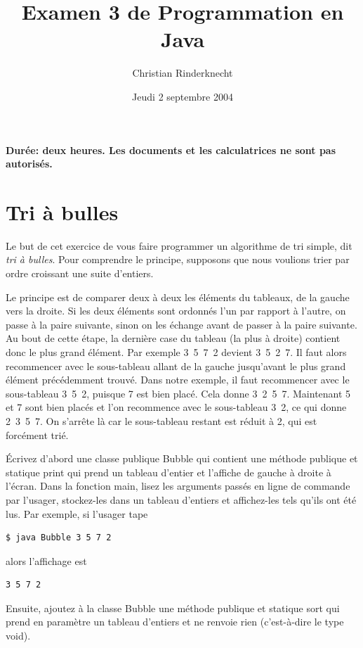 \documentclass[11pt,a4paper]{article}
\title{Examen 3 de Programmation en Java}
\author{Christian Rinderknecht}
\date{Jeudi 2 septembre 2004}
\begin{document}
\maketitle

\noindent
\textbf{Durée: deux heures. Les documents et les calculatrices ne sont
 pas autorisés.}


\section{Tri à bulles}

\noindent Le but de cet exercice de vous faire programmer un
algorithme de tri simple, dit \emph{tri à bulles}. Pour comprendre le
principe, supposons que nous voulions trier par ordre croissant une
suite d'entiers.

\medskip

Le principe est de comparer deux à deux les éléments du tableaux, de
la gauche vers la droite. Si les deux éléments sont ordonnés l'un par
rapport à l'autre, on passe à la paire suivante, sinon on les échange
avant de passer à la paire suivante. Au bout de cette étape, la
dernière case du tableau (la plus à droite) contient donc le plus
grand élément. Par exemple 3~5~7~2 devient 3~5~2~7. Il faut alors
recommencer avec le sous-tableau allant de la gauche jusqu'avant le
plus grand élément précédemment trouvé. Dans notre exemple, il faut
recommencer avec le sous-tableau 3~5~2, puisque 7 est bien placé. Cela
donne 3~2~5~7. Maintenant 5 et 7 sont bien placés et l'on recommence
avec le sous-tableau 3~2, ce qui donne 2~3~5~7. On s'arrête là car le
sous-tableau restant est réduit à 2, qui est forcément trié.

\medskip

Écrivez d'abord une classe publique \textsf{Bubble} qui contient une
méthode publique et statique \textsf{print} qui prend un tableau
d'entier et l'affiche de gauche à droite à l'écran. Dans la fonction
\textsf{main}, lisez les arguments passés en ligne de commande par
l'usager, stockez-les dans un tableau d'entiers et affichez-les tels
qu'ils ont été lus. Par exemple, si l'usager tape {\small
\begin{verbatim}
$ java Bubble 3 5 7 2
\end{verbatim}
}
\noindent alors l'affichage est
{\small
\begin{verbatim}
3 5 7 2
\end{verbatim}
}

\medskip

Ensuite, ajoutez à la classe \textsf{Bubble} une méthode publique et
statique \textsf{sort} qui prend en paramètre un tableau d'entiers et
ne renvoie rien (c'est-à-dire le type \textsf{void}).
\end{document}
